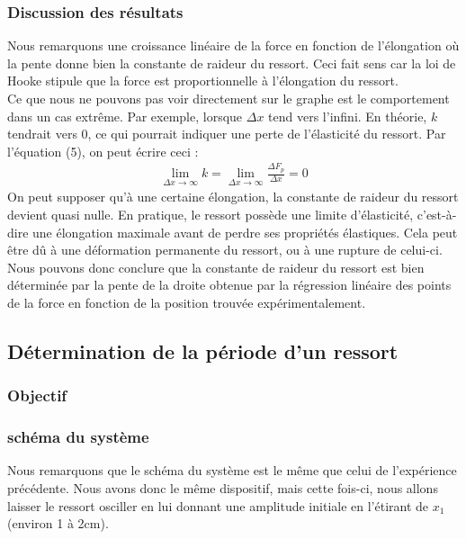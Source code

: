         \subsubsection{Discussion des résultats}
            Nous remarquons une croissance linéaire de la force en fonction de l'élongation où la pente
            donne bien la constante de raideur du ressort. Ceci fait sens car la loi de Hooke stipule que la force
            est proportionnelle à l'élongation du ressort. \\
            Ce que nous ne pouvons pas voir directement sur le graphe est le comportement dans un cas extrême.
            Par exemple, lorsque $\Delta x$ tend vers l'infini. En théorie, $k$ tendrait vers 0, ce qui pourrait indiquer 
            une perte de l'élasticité du ressort. Par l'équation (5), on peut écrire ceci :\\
            \begin{align*}
                \lim_{\Delta x \to \infty} k = \lim_{\Delta x \to \infty} \frac{\Delta F_p}{\Delta x} = 0
            \end{align*}
            On peut supposer qu'à une certaine élongation, la constante de raideur du ressort devient quasi nulle. En pratique,
            le ressort possède une limite d'élasticité, c'est-à-dire une élongation maximale avant de perdre ses propriétés élastiques.
            Cela peut être dû à une déformation permanente du ressort, ou à une rupture de celui-ci. \\
            Nous pouvons donc conclure que la constante de raideur du ressort est bien déterminée par la pente de la droite
            obtenue par la régression linéaire des points de la force en fonction de la position trouvée expérimentalement.
    \subsection{Détermination de la période d'un ressort}
        \subsubsection{Objectif}
        
        \subsubsection{schéma du système}
            
            Nous remarquons que le schéma du système est le même que celui de l'expérience précédente.
            Nous avons donc le même dispositif, mais cette fois-ci, nous allons laisser le ressort
            osciller en lui donnant une amplitude initiale en l'étirant de $x_1$ (environ 1 à 2cm).

